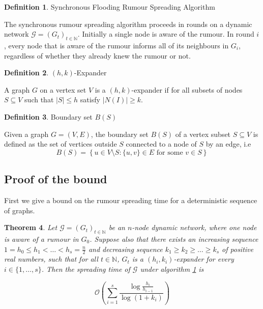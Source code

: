 \documentclass[a4paper,11pt]{article}
\newtheorem{theorem}{Theorem}[section]
\theoremstyle{definition}
\newtheorem{definition}[theorem]{Definition}
\newcommand{\ModelIntro}{
	Let $\mathcal{G} = (G_t)_{t \in \mathbb{N}}$ be an $n$-node dynamic network, where one node is aware of a rumour in $G_0$.
}
\begin{document}
\begin{definition} \label{SyncFloodingAlgorithm}
	Synchronous Flooding Rumour Spreading Algorithm

	\noindent
	The synchronous rumour spreading algorithm proceeds in rounds on a dynamic network $\mathcal{G} = (G_t)_{t \in \mathbb{N}}$. Initially a single node is aware of the rumour. In round $i$, every node that is aware of the rumour informs all of its neighbours in $G_i$, regardless of whether they already knew the rumour or not.
\end{definition}


\begin{definition}
	$(h, k)$-Expander

	\noindent
	A graph $G$ on a vertex set $V$ is a $(h, k)$-expander if for all subsets of nodes $S \subseteq V$ such that $|S| \leq h$ satisfy $|N(I)| \geq k$.
\end{definition}

\begin{definition}
	Boundary set $B(S)$

	\noindent 
	Given a graph $G=(V,E)$, the boundary set $B(S)$ of a vertex subset $S \subseteq V$ is defined as the set of vertices outside $S$ connected to a node of $S$ by an edge, i.e
	$$
		B(S) = \left\{u \in V \setminus S : \{u, v\} \in E \text{ for some } v \in S \right\}
	$$
\end{definition}

\subsection{Proof of the bound}

First we give a bound on the rumour spreading time for a deterministic sequence of graphs. 

\begin{theorem}
	\ModelIntro Suppose also that there exists an increasing sequence $1 = h_0 \leq h_1 < \dots < h_s = \frac{n}{2}$ and decreasing sequence $k_1 \geq k_2 \geq \dots \geq k_s$ of positive real numbers, such that for all $t \in \mathbb{N}$, $G_t$ is a $(h_i, k_i)$-expander for every $i \in \{1, \dots , s\}$. Then the spreading time of $\mathcal{G}$ under algorithm \ref{SyncFloodingAlgorithm} is

	$$
		\mathcal{O}\left(\sum_{i=1}^s \frac{\log \frac{h_i}{h_{i-1}}}{\log(1+k_i)}\right)
	$$
\end{theorem}
\end{document}
